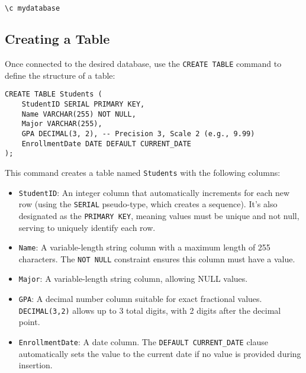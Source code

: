 \documentclass[12pt]{book}
\begin{document}
\begin{lstlisting}[language=SQL, basicstyle=\ttfamily\small, frame=none, numbers=none] 
\c mydatabase
\end{lstlisting}

\subsection{Creating a Table}

Once connected to the desired database, use the \texttt{CREATE TABLE} command to define the structure of a table:

\begin{lstlisting}[caption={Creating the Students Table}, label=lst:create_table_students]
CREATE TABLE Students (
    StudentID SERIAL PRIMARY KEY,
    Name VARCHAR(255) NOT NULL,
    Major VARCHAR(255),
    GPA DECIMAL(3, 2), -- Precision 3, Scale 2 (e.g., 9.99)
    EnrollmentDate DATE DEFAULT CURRENT_DATE
);
\end{lstlisting}

This command creates a table named \texttt{Students} with the following columns:

\begin{itemize}
    \item \texttt{StudentID}: An integer column that automatically increments for each new row (using the \texttt{SERIAL} pseudo-type, which creates a sequence). It's also designated as the \texttt{PRIMARY KEY}, meaning values must be unique and not null, serving to uniquely identify each row.
    \item \texttt{Name}: A variable-length string column with a maximum length of 255 characters. The \texttt{NOT NULL} constraint ensures this column must have a value.
    \item \texttt{Major}: A variable-length string column, allowing NULL values.
    \item \texttt{GPA}: A decimal number column suitable for exact fractional values. \texttt{DECIMAL(3,2)} allows up to 3 total digits, with 2 digits after the decimal point.
    \item \texttt{EnrollmentDate}: A date column. The \texttt{DEFAULT CURRENT\_DATE} clause automatically sets the value to the current date if no value is provided during insertion.
\end{itemize}
\end{document}
